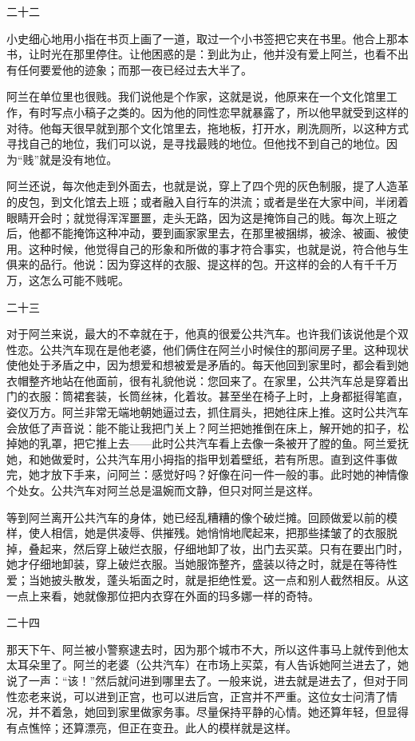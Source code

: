 二十二 

小史细心地用小指在书页上画了一道，取过一个小书签把它夹在书里。他合上那本书，让时光在那里停住。让他困惑的是：到此为止，他并没有爱上阿兰，也看不出有任何要爱他的迹象；而那一夜已经过去大半了。 

阿兰在单位里也很贱。我们说他是个作家，这就是说，他原来在一个文化馆里工作，有时写点小稿子之类的。因为他的同性恋早就暴露了，所以他早就受到这样的对待。他每天很早就到那个文化馆里去，拖地板，打开水，刷洗厕所，以这种方式寻找自己的地位，我们可以说，是寻找最贱的地位。但他找不到自己的地位。因为“贱”就是没有地位。 

阿兰还说，每次他走到外面去，也就是说，穿上了四个兜的灰色制服，提了人造革的皮包，到文化馆去上班；或者融入自行车的洪流；或者是坐在大家中间，半闭着眼睛开会时；就觉得浑浑噩噩，走头无路，因为这是掩饰自己的贱。每次上班之后，他都不能掩饰这种冲动，要到画家家里去，在那里被捆绑，被涂、被画、被使用。这种时候，他觉得自己的形象和所做的事才符合事实，也就是说，符合他与生俱来的品行。他说：因为穿这样的衣服、提这样的包。开这样的会的人有千千万万，这怎么可能不贱呢。 

二十三 

对于阿兰来说，最大的不幸就在于，他真的很爱公共汽车。也许我们该说他是个双性恋。公共汽车现在是他老婆，他们俩住在阿兰小时候住的那间房子里。这种现状使他处于矛盾之中，因为想爱和想被爱是矛盾的。每天他回到家里时，都会看到她衣帽整齐地站在他面前，很有礼貌他说：您回来了。在家里，公共汽车总是穿着出门的衣服：筒裙套装，长筒丝袜，化着妆。甚至坐在椅子上时，上身都挺得笔直，姿仪万方。阿兰非常无端地朝她逼过去，抓住肩头，把她往床上推。这时公共汽车会放低了声音说：能不能让我把门关上？阿兰把她推倒在床上，解开她的扣子，松掉她的乳罩，把它推上去——此时公共汽车看上去像一条被开了膛的鱼。阿兰爱抚她，和她做爱时，公共汽车用小拇指的指甲划着壁纸，若有所思。直到这件事做完，她才放下手来，问阿兰：感觉好吗？好像在问一件一般的事。此时她的神情像个处女。公共汽车对阿兰总是温婉而文静，但只对阿兰是这样。 

等到阿兰离开公共汽车的身体，她已经乱糟糟的像个破烂摊。回顾做爱以前的模样，使人相信，她是供凌辱、供摧残。她悄悄地爬起来，把那些揉皱了的衣服脱掉，叠起来，然后穿上破烂衣服，仔细地卸了妆，出门去买菜。只有在要出门时，她才仔细地卸装，穿上破烂衣服。当她服饰整齐，盛装以待之时，就是在等待性爱；当她披头散发，蓬头垢面之时，就是拒绝性爱。这一点和别人截然相反。从这一点上来看，她就像那位把内衣穿在外面的玛多娜一样的奇特。 

二十四 

那天下午、阿兰被小警察逮去时，因为那个城市不大，所以这件事马上就传到他太太耳朵里了。阿兰的老婆（公共汽车）在市场上买菜，有人告诉她阿兰进去了，她说了一声：“该！”然后就问进到哪里去了。一般来说，进去就是进去了，但对于同性恋老来说，可以进到正宫，也可以进后宫，正宫并不严重。这位女士问清了情况，并不着急，她回到家里做家务事。尽量保持平静的心情。她还算年轻，但显得有点憔悴；还算漂亮，但正在变丑。此人的模样就是这样。 

